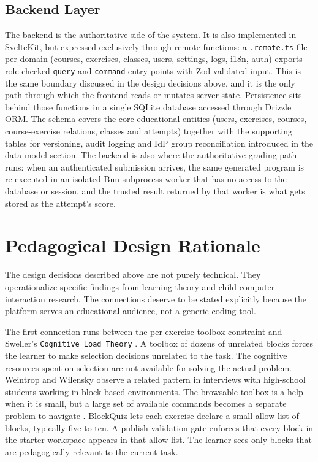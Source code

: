 \subsection{Backend Layer}
The backend is the authoritative side of the system. It is also implemented in SvelteKit, but expressed
exclusively through remote functions: a \texttt{.remote.ts} file per domain (courses, exercises, classes, users, settings, logs, i18n, auth)
exports role-checked \texttt{query} and \texttt{command} entry points with Zod-validated input. This is the same boundary discussed in
the design decisions above, and it is the only path through which the frontend reads or mutates server state.
Persistence sits behind those functions in a single SQLite database accessed through Drizzle ORM. The schema covers the core
educational entities (users, exercises, courses, course-exercise relations, classes and attempts) together with the supporting
tables for versioning, audit logging and IdP group reconciliation introduced in the data model section.
The backend is also where the authoritative grading path runs: when an authenticated submission arrives, the same generated
program is re-executed in an isolated Bun subprocess worker that has no access to the database or session, and the trusted
result returned by that worker is what gets stored as the attempt's score.

\section{Pedagogical Design Rationale}
\label{sec:design-pedagogy}

The design decisions described above are not purely technical. They
operationalize specific findings from learning theory and
child-computer interaction research. The connections deserve to be
stated explicitly because the platform serves an educational audience,
not a generic coding tool.

The first connection runs between the per-exercise toolbox constraint
and Sweller's \texttt{Cognitive Load Theory} \cite{sweller1988}. A toolbox of dozens of 
unrelated blocks forces the learner to make selection decisions unrelated to the task. 
The cognitive resources spent on selection are not available for solving the actual problem. 
Weintrop and Wilensky observe a related pattern in interviews with
high-school students working in block-based environments. The browsable toolbox is a help when 
it is small, but a large set of available commands becomes a separate problem to navigate
\cite{weintrop2015}. BlockQuiz lets each exercise declare a small
allow-list of blocks, typically five to ten. A publish-validation
gate enforces that every block in the starter workspace appears in
that allow-list. The learner sees only blocks that are pedagogically
relevant to the current task.

